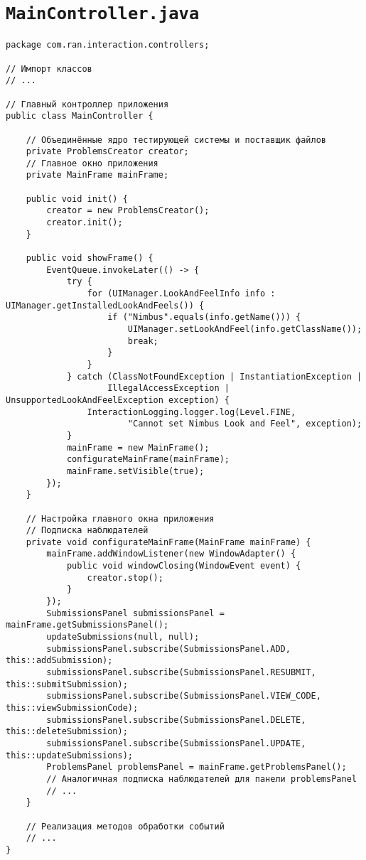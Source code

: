 \section*{\texttt{MainController.java}}
\begin{verbatim}
package com.ran.interaction.controllers;

// Импорт классов
// ...

// Главный контроллер приложения
public class MainController {

    // Объединённые ядро тестирующей системы и поставщик файлов
    private ProblemsCreator creator;
    // Главное окно приложения
    private MainFrame mainFrame;

    public void init() {
        creator = new ProblemsCreator();
        creator.init();
    }
    
    public void showFrame() {
        EventQueue.invokeLater(() -> {
            try {
                for (UIManager.LookAndFeelInfo info : UIManager.getInstalledLookAndFeels()) {
                    if ("Nimbus".equals(info.getName())) {
                        UIManager.setLookAndFeel(info.getClassName());
                        break;
                    }
                }
            } catch (ClassNotFoundException | InstantiationException |
                    IllegalAccessException | UnsupportedLookAndFeelException exception) {
                InteractionLogging.logger.log(Level.FINE,
                        "Cannot set Nimbus Look and Feel", exception);
            }
            mainFrame = new MainFrame();
            configurateMainFrame(mainFrame);
            mainFrame.setVisible(true);
        });
    }

    // Настройка главного окна приложения
    // Подписка наблюдателей
    private void configurateMainFrame(MainFrame mainFrame) {
        mainFrame.addWindowListener(new WindowAdapter() {
            public void windowClosing(WindowEvent event) {
                creator.stop();
            }
        });
        SubmissionsPanel submissionsPanel = mainFrame.getSubmissionsPanel();
        updateSubmissions(null, null);
        submissionsPanel.subscribe(SubmissionsPanel.ADD, this::addSubmission);
        submissionsPanel.subscribe(SubmissionsPanel.RESUBMIT, this::submitSubmission);
        submissionsPanel.subscribe(SubmissionsPanel.VIEW_CODE, this::viewSubmissionCode);
        submissionsPanel.subscribe(SubmissionsPanel.DELETE, this::deleteSubmission);
        submissionsPanel.subscribe(SubmissionsPanel.UPDATE, this::updateSubmissions);
        ProblemsPanel problemsPanel = mainFrame.getProblemsPanel();
        // Аналогичная подписка наблюдателей для панели problemsPanel
        // ...
    }
    
    // Реализация методов обработки событий
    // ...
}
\end{verbatim}